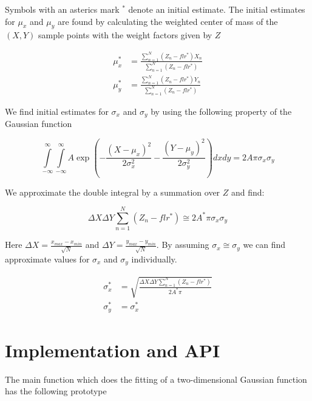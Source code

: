 \documentclass{article}
\begin{document}
Symbols with an asterics mark $^*$ denote an initial estimate. The initial estimates for $\mu_x$ and $\mu_y$ are found by calculating the weighted center of mass of the $(X,Y)$ sample points with the weight factors given by $Z$ 

\begin{align}
\mu_x^* &= \frac{\sum\limits_{n=1}^N (Z_n-flr^*)X_n}{\sum\limits_{n=1}^N(Z_n-flr^*)}\\
\mu_y^* &= \frac{\sum\limits_{n=1}^N (Z_n-flr^*)Y_n}{\sum\limits_{n=1}^N(Z_n-flr^*)}
\end{align}

We find initial estimates for $\sigma_x$ and $\sigma_y$ by using the following property of the Gaussian function 

\begin{equation}
\int\limits_{-\infty}^{\infty}\int\limits_{-\infty}^{\infty}A\exp(-\frac{(X-\mu_x)^2}{2\sigma_x^2}-\frac{(Y-\mu_y)^2}{2\sigma_y^2})dxdy=2A\pi\sigma_x\sigma_y
\end{equation}

We approximate the double integral by a summation over $Z$ and find:

\begin{equation}
\Delta X\Delta Y\sum\limits_{n=1}^N(Z_n-flr^*) \cong 2A^*\pi\sigma_x\sigma_y
\end{equation}

Here $\Delta X = \frac{x_{max}-x_{min}}{\sqrt{N}}$ and $\Delta Y = \frac{y_{max}-y_{min}}{\sqrt{N}}$. By assuming $\sigma_x\cong\sigma_y$ we can find approximate values for $\sigma_x$ and $\sigma_y$ individually.


\begin{align}
\sigma_x^* &= \sqrt{\frac{\Delta X\Delta Y\sum\limits_{n=1}^N(Z_n-flr^*)}{2A^*\pi}}\\
\sigma_y^* &= \sigma_x^*
\end{align}

\section{Implementation and API}

The main function which does the fitting of a two-dimensional Gaussian function has the following prototype
\end{document}
